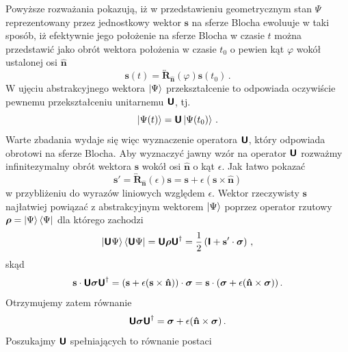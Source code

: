 \documentclass{myclass}
\begin{document}
Powyższe rozważania pokazują, iż w przedstawieniu geometrycznym stan \(\Psi\) reprezentowany przez
jednostkowy wektor \(\mathbf{s}\) na sferze Blocha ewoluuje w taki sposób, iż efektywnie jego
położenie na sferze Blocha w czasie \(t\) można przedstawić jako obrót wektora położenia w czasie
\(t_0\) o pewien kąt \(\varphi\) wokół ustalonej osi \(\mathbf{\hat{n}}\)
\begin{equation*}
    \mathbf{s}(t) = \overleftrightarrow{\mathbf{R}}_\mathbf{\hat{n}}(\varphi)\mathbf{s}(t_0)\,.
\end{equation*}
W ujęciu abstrakcyjnego wektora \(\ket{\Psi}\) przekształcenie to odpowiada oczywiście pewnemu
przekształceniu unitarnemu \(\boldsymbol{\mathsf{U}}\), tj.
\begin{equation*}
    \ket{\Psi(t)} = \boldsymbol{\mathsf{U}}\ket{\Psi(t_0)}\,.
\end{equation*}
Warte zbadania wydaje się więc wyznaczenie operatora \(\boldsymbol{\mathsf{U}}\), który odpowiada obrotowi na
sferze Blocha. Aby wyznaczyć jawny wzór na operator \(\boldsymbol{\mathsf{U}}\) rozważmy infinitezymalny obrót
wektora \(\mathbf{s}\) wokół osi \(\mathbf{\hat{n}}\) o kąt \(\epsilon\). Jak łatwo pokazać
\begin{equation*}
    \mathbf{s}' = \overleftrightarrow{\mathbf{R}}_\mathbf{\hat{n}}(\epsilon)\mathbf{s} = \mathbf{s} + \epsilon(\mathbf{s}\times\mathbf{\hat{n}})
\end{equation*}
w przybliżeniu do wyrazów liniowych względem \(\epsilon\). Wektor rzeczywisty \(\mathbf{s}\)
najłatwiej powiązać z abstrakcyjnym wektorem \(\ket{\Psi}\) poprzez operator rzutowy \(\boldsymbol{\mathsf{\rho}} =
\ket{\Psi}\bra{\Psi}\) dla którego zachodzi
\begin{equation*}
    \ket{\boldsymbol{\mathsf{U}}\Psi}\bra{\boldsymbol{\mathsf{U}}\Psi} = \boldsymbol{\mathsf{U}}\boldsymbol{\mathsf{\rho}}\boldsymbol{\mathsf{U}}^\dagger = \frac{1}{2}\left(\boldsymbol{\mathsf{I}} + \mathbf{s}'\cdot\boldsymbol{\sigma}\right)\,,
\end{equation*}
skąd
\begin{equation*}
    \mathbf{s}\cdot\boldsymbol{\mathsf{U}}\boldsymbol{\sigma}\boldsymbol{\mathsf{U}}^\dagger = (\mathbf{s} + \epsilon(\mathbf{s}\times\mathbf{\hat{n}}))\cdot\boldsymbol{\sigma} = \mathbf{s}\cdot(\boldsymbol{\sigma} + \epsilon(\mathbf{\hat{n}}\times\boldsymbol{\sigma}))\,.
\end{equation*}
Otrzymujemy zatem równanie
\begin{equation*}
    \boldsymbol{\mathsf{U}}\boldsymbol{\sigma}\boldsymbol{\mathsf{U}}^\dagger = \boldsymbol{\sigma} + \epsilon(\mathbf{\hat{n}}\times\boldsymbol{\sigma})\,.
\end{equation*}
Poszukajmy \(\boldsymbol{\mathsf{U}}\) spełniających to równanie postaci
\end{document}
